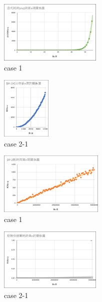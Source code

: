 \begin{minipage}{\linewidth}
    \centering
    \begin{minipage}{0.45\linewidth}
        \begin{figure}[H]
            \includegraphics[height=3cm]{picture/rail_re_graph.png}
            \caption{case 1}
        \end{figure}
    \end{minipage}
    \begin{minipage}{0.45\linewidth}
        \begin{figure}[H]
            \includegraphics[height=3cm]{picture/rail_dp1.png}
            \caption{case 2-1}
        \end{figure}
    \end{minipage}
    \begin{minipage}{0.45\linewidth}
        \begin{figure}[H]
            \includegraphics[height=3cm]{picture/rail_dp2.png}
            \caption{case 1}
        \end{figure}
    \end{minipage}
    \begin{minipage}{0.45\linewidth}
        \begin{figure}[H]
            \includegraphics[height=3cm]{picture/rail_pow.png}
            \caption{case 2-1}
        \end{figure}
    \end{minipage}
\end{minipage}

